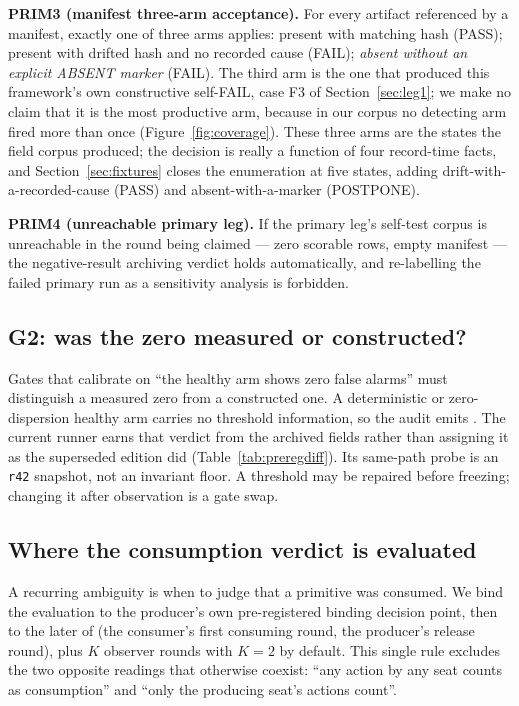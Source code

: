 \documentclass{article}
\begin{document}
\textbf{PRIM3 (manifest three-arm acceptance).} For every artifact referenced by a
manifest, exactly one of three arms applies: present with matching hash (PASS); present
with drifted hash and no recorded cause (FAIL); \emph{absent without an explicit ABSENT
marker} (FAIL). The third arm is the one that produced this framework's own constructive
self-FAIL, case F3 of Section~\ref{sec:leg1}; we make no claim that it is the most productive
arm, because in our corpus no detecting arm fired more than once (Figure~\ref{fig:coverage}).
These three arms are
the states the field corpus produced; the decision is really a function of four record-time
facts, and Section~\ref{sec:fixtures} closes the enumeration at five states, adding
drift-with-a-recorded-cause (PASS) and absent-with-a-marker (POSTPONE).

\textbf{PRIM4 (unreachable primary leg).} If the primary leg's self-test corpus is
unreachable in the round being claimed --- zero scorable rows, empty manifest --- the
negative-result archiving verdict holds automatically, and re-labelling the failed primary
run as a sensitivity analysis is forbidden.

\subsection{G2: was the zero measured or constructed?}
\label{sec:g2}

Gates that calibrate on ``the healthy arm shows zero false alarms'' must distinguish a
measured zero from a constructed one. A deterministic or zero-dispersion healthy arm carries
no threshold information, so the audit emits . The
current runner earns that verdict from the archived fields rather than assigning it as the
superseded edition did (Table~\ref{tab:preregdiff}). Its same-path probe is an
\texttt{r42} snapshot, not an invariant floor. A threshold may be repaired before freezing;
changing it after observation is a gate swap.

\subsection{Where the consumption verdict is evaluated}
\label{sec:binding}

A recurring ambiguity is when to judge that a primitive was consumed. We bind the
evaluation to the producer's own pre-registered binding decision point, then to the later
of (the consumer's first consuming round, the producer's release round), plus $K$ observer
rounds with $K=2$ by default. This single rule excludes the two opposite readings that
otherwise coexist: ``any action by any seat counts as consumption'' and ``only the
producing seat's actions count''.
\end{document}
